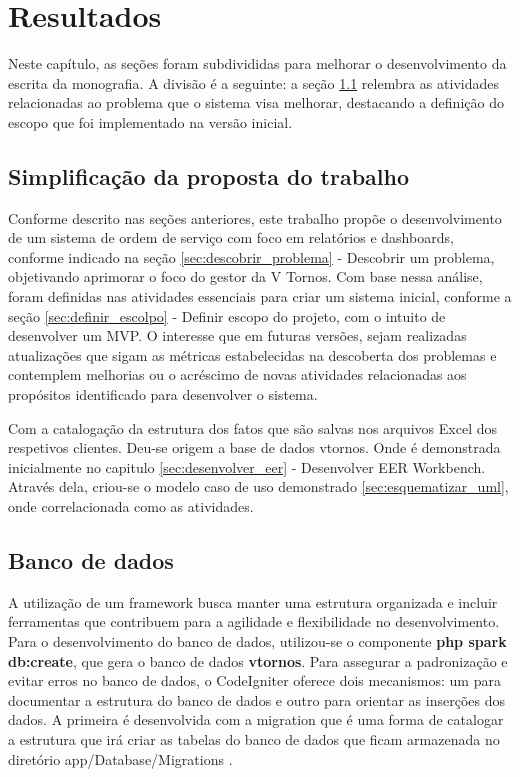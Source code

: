 \chapter{Resultados}

Neste capítulo, as seções foram subdivididas para melhorar o desenvolvimento da escrita da monografia. A divisão é a seguinte: a seção \ref{sec:Simplificando_trabalho} relembra as atividades relacionadas ao problema que o sistema visa melhorar, destacando a definição do escopo que foi implementado na versão inicial.

\section{Simplificação da proposta do trabalho}
\label{sec:Simplificando_trabalho}

Conforme descrito nas seções anteriores, este trabalho propõe o desenvolvimento de um sistema de ordem de serviço com foco em relatórios e dashboards, conforme indicado na seção \ref{sec:descobrir_problema} - Descobrir um problema, objetivando aprimorar o foco do gestor da V Tornos. Com base nessa análise, foram definidas nas atividades essenciais para criar um sistema inicial, conforme a seção \ref{sec:definir_escolpo} - Definir escopo do projeto, com o intuito de desenvolver um MVP. O interesse que em futuras versões, sejam realizadas atualizações que sigam as métricas estabelecidas na descoberta dos problemas e contemplem melhorias ou o acréscimo de novas atividades relacionadas aos propósitos identificado para desenvolver o sistema.

Com a catalogação da estrutura dos fatos que são salvas nos arquivos Excel dos respetivos clientes. Deu-se origem a base de dados vtornos. Onde é demonstrada inicialmente no capitulo \ref{sec:desenvolver_eer} - Desenvolver EER Workbench. Através dela, criou-se o modelo caso de uso demonstrado \ref{sec:esquematizar_uml}, onde correlacionada como as atividades. 
\section{Banco de dados}
\label{sec:banco_dados}
A utilização de um framework busca manter uma estrutura organizada e incluir ferramentas que contribuem para a agilidade e flexibilidade no desenvolvimento. Para o desenvolvimento do banco de dados, utilizou-se o componente \textbf{php spark db:create}, que gera o banco de dados \textbf{vtornos}. Para assegurar a padronização e evitar erros no banco de dados, o CodeIgniter oferece dois mecanismos: um para documentar a estrutura do banco de dados e outro para orientar as inserções dos dados. A primeira é desenvolvida com a migration que é uma forma de catalogar a estrutura que irá criar as tabelas do banco de dados que ficam armazenada no diretório app/Database/Migrations \cite{b:codeigniter4_2020} .


